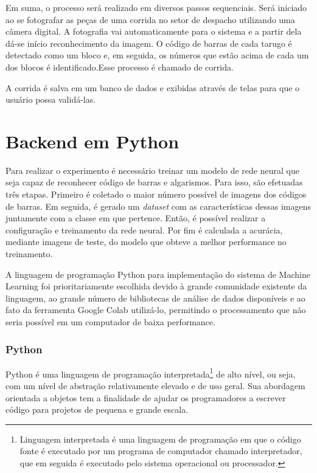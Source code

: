 Em suma, o processo será realizado em diversos passos sequenciais. Será iniciado ao se fotografar as peças de uma corrida no setor de despacho utilizando uma câmera digital. A fotografia vai automaticamente para o sistema e a partir dela dá-se início reconhecimento da imagem. O código de barras de cada tarugo é detectado como um bloco e, em seguida, os números que estão acima de cada um dos blocos é identificado.Esse processo é chamado de corrida. 

A corrida é salva em um banco de dados e exibidas através de telas para que o usuário possa validá-las.


\section{Backend em Python} \label{sec:backend}

Para realizar o experimento é necessário treinar um modelo de rede neural que seja capaz de reconhecer código de barras e algarismos. Para isso, são efetuadas três etapas. Primeiro é coletado o maior número possível de imagens dos códigos de barras. Em seguida, é gerado um \textit{dataset} com as características dessas imagens juntamente com a classe em que pertence. Então, é possível realizar a configuração e treinamento da rede neural. Por fim é calculada a acurácia, mediante imagens de teste, do modelo que obteve a melhor performance no treinamento.

A linguagem de programação Python para implementação do sistema de Machine Learning foi prioritariamente escolhida devido à grande comunidade existente da linguagem, ao grande número de bibliotecas de análise de dados disponíveis e ao fato da ferramenta Google Colab utilizá-lo, permitindo o processamento que não seria possível em um computador de baixa performance.


\subsubsection*{Python}

Python é uma linguagem de programação interpretada\footnote{Linguagem interpretada é uma linguagem de programação em que o código fonte é executado por um programa de computador chamado interpretador, que em seguida é executado pelo sistema operacional ou processador.} de alto nível, ou seja, com um nível de abstração relativamente elevado e de uso geral. Sua abordagem orientada a objetos tem a finalidade de ajudar os programadores a escrever código para projetos de pequena e grande escala.

